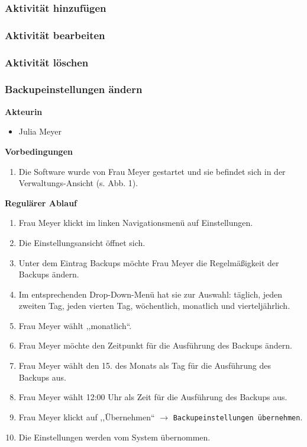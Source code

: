 \documentclass[fontsize=12pt,paper=a4,twoside]{scrartcl}
\begin{document}
\subsubsection{Aktivität hinzufügen}

\subsubsection{Aktivität bearbeiten}

\subsubsection{Aktivität löschen}

\subsubsection{Backupeinstellungen ändern}
\textbf{Akteurin}
\begin{itemize}
\item Julia Meyer
\end{itemize}
\vspace{5pt}

\textbf{Vorbedingungen}
\begin{enumerate}
\item Die Software wurde von Frau Meyer gestartet und sie befindet sich in der Verwaltungs-Ansicht (s. Abb. 1).
\end{enumerate}
\vspace{5pt}

\textbf{Regulärer Ablauf}
\begin{enumerate}
\item Frau Meyer klickt im linken Navigationsmenü auf Einstellungen.
\item Die Einstellungsansicht öffnet sich. 
\item Unter dem Eintrag Backups möchte Frau Meyer die Regelmäßigkeit der Backups ändern.
\item Im entsprechenden Drop-Down-Menü hat sie zur Auswahl: täglich, jeden zweiten Tag, jeden vierten Tag, wöchentlich, monatlich und vierteljährlich.
\item Frau Meyer wählt ,,monatlich``.
\item Frau Meyer möchte den Zeitpunkt für die Ausführung des Backups ändern.
\item Frau Meyer wählt den 15. des Monats als Tag für die Ausführung des Backups aus.
\item Frau Meyer wählt 12:00 Uhr als Zeit für die Ausführung des Backups aus.
\item Frau Meyer klickt auf ,,Übernehmen`` $\rightarrow$ \texttt{Backupeinstellungen übernehmen}.
\item Die Einstellungen werden vom System übernommen.
\end{enumerate}
\vspace{5pt}
\end{document}
